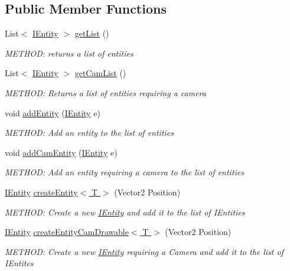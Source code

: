 \subsection*{Public Member Functions}
\begin{DoxyCompactItemize}
\item 
List$<$ \hyperlink{a00438}{I\+Entity} $>$ \hyperlink{a00442_a8f71921098ae85f7f504f61a399a1bd8}{get\+List} ()
\begin{DoxyCompactList}\small\item\em M\+E\+T\+H\+OD\+: returns a list of entities \end{DoxyCompactList}\item 
List$<$ \hyperlink{a00438}{I\+Entity} $>$ \hyperlink{a00442_a6a6229acffece1f804ba440cf847820d}{get\+Cam\+List} ()
\begin{DoxyCompactList}\small\item\em M\+E\+T\+H\+OD\+: Returns a list of entities requiring a camera \end{DoxyCompactList}\item 
void \hyperlink{a00442_af229fa3936a8483383bb7ddd5b4184b0}{add\+Entity} (\hyperlink{a00438}{I\+Entity} e)
\begin{DoxyCompactList}\small\item\em M\+E\+T\+H\+OD\+: Add an entity to the list of entities \end{DoxyCompactList}\item 
void \hyperlink{a00442_a37055c1d97dd8da61a53a2b0683df54d}{add\+Cam\+Entity} (\hyperlink{a00438}{I\+Entity} e)
\begin{DoxyCompactList}\small\item\em M\+E\+T\+H\+OD\+: Add an entity requiring a camera to the list of entities \end{DoxyCompactList}\item 
\hyperlink{a00438}{I\+Entity} \hyperlink{a00442_a8f746b319d35a76cb4cdb1853f3069ed}{create\+Entity$<$ T $>$} (Vector2 Position)
\begin{DoxyCompactList}\small\item\em M\+E\+T\+H\+OD\+: Create a new \hyperlink{a00438}{I\+Entity} and add it to the list of I\+Entities \end{DoxyCompactList}\item 
\hyperlink{a00438}{I\+Entity} \hyperlink{a00442_aad35a164d944dcb7af20470bac0d3351}{create\+Entity\+Cam\+Drawable$<$ T $>$} (Vector2 Position)
\begin{DoxyCompactList}\small\item\em M\+E\+T\+H\+OD\+: Create a new \hyperlink{a00438}{I\+Entity} requiring a Camera and add it to the list of I\+Entites \end{DoxyCompactList}\item 

\end{DoxyCompactItemize}
